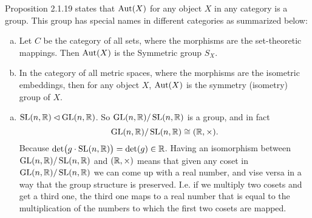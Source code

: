 \begin{observation}
	Proposition 2.1.19 states that $ \operatorname{Aut}(X) $ for any object $ X $ in any category is a group. This group has special names in different categories as summarized below:
	\begin{enumerate}[(a)]
		\item Let $ C $ be the category of all sets, where the morphisms are the set-theoretic mappings. Then $ \operatorname{Aut}(X) $ is the Symmetric group $ S_X $.
		\item In the category of all metric spaces, where the morphisms are the isometric embeddings, then for any object $ X $, $ \operatorname{Aut}(X) $ is the symmetry (isometry) group of $ X $.
	\end{enumerate}
\end{observation}


\begin{summary}
	\begin{enumerate}[(a)]
		\item $ \operatorname{SL}(n,\mathbb{R}) \lhd \operatorname{GL}(n,\mathbb{R}) $. So $ \operatorname{GL}(n,\mathbb{R})/\operatorname{SL}(n,\mathbb{R}) $ is a group, and in fact
		\[ \operatorname{GL}(n,\mathbb{R})/\operatorname{SL}(n,\mathbb{R}) \cong (\mathbb{R},\times). \]
		Because $ \det(g\cdot \operatorname{SL}(n,\mathbb{R})) = \det(g) \in \mathbb{R} $. Having an isomorphism between $ \operatorname{GL}(n,\mathbb{R})/\operatorname{SL}(n,\mathbb{R}) $ and $ (\mathbb{R},\times) $ means that given any coset in $ \operatorname{GL}(n,\mathbb{R})/\operatorname{SL}(n,\mathbb{R}) $ we can come up with a real number, and vise versa in a way that the group structure is preserved. I.e. if we multiply two cosets and get a third one, the third one maps to a real number that is equal to the multiplication of the numbers to which the first two cosets are mapped.
	\end{enumerate}
\end{summary}

